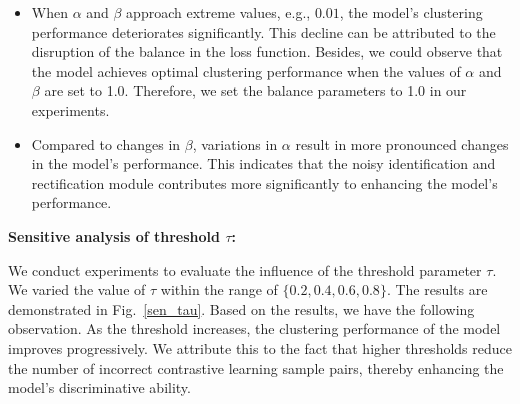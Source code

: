\documentclass{article}
\theoremstyle{plain}
\theoremstyle{definition}
\theoremstyle{remark}
\begin{document}
\begin{itemize}
  \item When $\alpha$ and $\beta$ approach extreme values, e.g., $0.01$, the model's clustering performance deteriorates significantly. This decline can be attributed to the disruption of the balance in the loss function. Besides, we could observe that the model achieves optimal clustering performance when the values of $\alpha$ and $\beta$ are set to 1.0. Therefore, we set the balance parameters to 1.0 in our experiments.

  \item Compared to changes in $\beta$, variations in $\alpha$ result in more pronounced changes in the model's performance. This indicates that the noisy identification and rectification module contributes more significantly to enhancing the model's performance.

\end{itemize}




\textbf{Sensitive analysis of threshold $\tau$:}

We conduct experiments to evaluate the influence of the threshold parameter $\tau$. We varied the value of $\tau$ within the range of $\{0.2, 0.4, 0.6, 0.8\}$. The results are demonstrated in Fig.~\ref{sen_tau}. Based on the results, we have the following observation. As the threshold increases, the clustering performance of the model improves progressively. We attribute this to the fact that higher thresholds reduce the number of incorrect contrastive learning sample pairs, thereby enhancing the model's discriminative ability.
\end{document}
